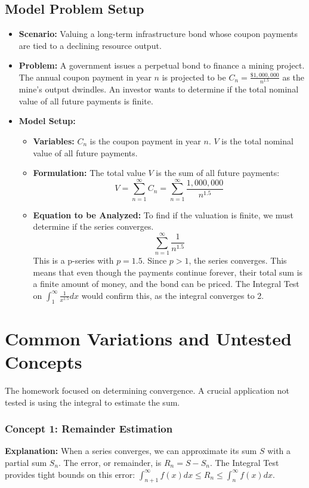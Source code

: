 \documentclass{article}
\begin{document}
\subsection{Model Problem Setup}
\begin{itemize}
    \item \textbf{Scenario:} Valuing a long-term infrastructure bond whose coupon payments are tied to a declining resource output.
    \item \textbf{Problem:} A government issues a perpetual bond to finance a mining project. The annual coupon payment in year $n$ is projected to be $C_n = \frac{\$1,000,000}{n^{1.5}}$ as the mine's output dwindles. An investor wants to determine if the total nominal value of all future payments is finite.
    \item \textbf{Model Setup:}
    \begin{itemize}
        \item \textbf{Variables:} $C_n$ is the coupon payment in year $n$. $V$ is the total nominal value of all future payments.
        \item \textbf{Formulation:} The total value $V$ is the sum of all future payments:
        \[ V = \sum_{n=1}^{\infty} C_n = \sum_{n=1}^{\infty} \frac{1,000,000}{n^{1.5}} \]
        \item \textbf{Equation to be Analyzed:} To find if the valuation is finite, we must determine if the series converges.
        \[ \sum_{n=1}^{\infty} \frac{1}{n^{1.5}} \]
        This is a p-series with $p=1.5$. Since $p>1$, the series converges. This means that even though the payments continue forever, their total sum is a finite amount of money, and the bond can be priced. The Integral Test on $\int_1^\infty \frac{1}{x^{1.5}}dx$ would confirm this, as the integral converges to 2.
    \end{itemize}
\end{itemize}

\section{Common Variations and Untested Concepts}
The homework focused on determining convergence. A crucial application not tested is using the integral to estimate the sum.

\subsubsection{Concept 1: Remainder Estimation}
\textbf{Explanation:} When a series converges, we can approximate its sum $S$ with a partial sum $S_n$. The error, or remainder, is $R_n = S - S_n$. The Integral Test provides tight bounds on this error: $\int_{n+1}^\infty f(x) dx \le R_n \le \int_n^\infty f(x) dx$.
\end{document}
